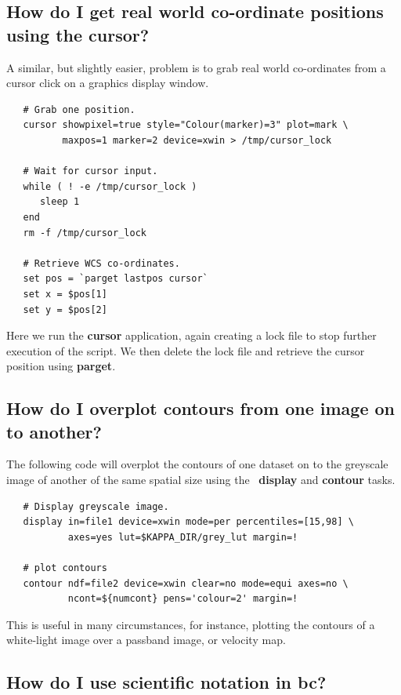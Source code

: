 \documentclass[twoside,11pt]{article}
\newcommand{\xref}[3]{#1}
\begin{document}
\begin{\htmlonly}
{\subsection{How do I get real world co-ordinate positions using the cursor?}

A similar, but slightly easier, problem is to grab real world
co-ordinates from a cursor click on a graphics display window.

\small\begin{verbatim}
   # Grab one position.
   cursor showpixel=true style="Colour(marker)=3" plot=mark \
          maxpos=1 marker=2 device=xwin > /tmp/cursor_lock

   # Wait for cursor input.	  
   while ( ! -e /tmp/cursor_lock )
      sleep 1
   end
   rm -f /tmp/cursor_lock
   
   # Retrieve WCS co-ordinates.
   set pos = `parget lastpos cursor`
   set x = $pos[1]
   set y = $pos[2]
\end{verbatim}\normalsize

Here we run the \xref{{\bf cursor}}{sun95}{CURSOR} application, again
creating a lock file to stop further execution of the script.  We then
delete the lock file and retrieve the cursor position using
\xref{{\bf parget}}{sun95}{PARGET}.

\subsection{How do I overplot contours from one image on to another?}

The following code will overplot the contours of one dataset on to the
greyscale image of another of the same spatial size using the \KAPPA\ 
\xref{{\bf display}}{sun95}{DISPLAY} and \xref{{\bf contour}}{sun95}{CONTOUR}
tasks.

\small\begin{verbatim}
   # Display greyscale image.
   display in=file1 device=xwin mode=per percentiles=[15,98] \
           axes=yes lut=$KAPPA_DIR/grey_lut margin=! 
	   
   # plot contours
   contour ndf=file2 device=xwin clear=no mode=equi axes=no \
           ncont=${numcont} pens='colour=2' margin=! 
\end{verbatim}\normalsize

This is useful in many circumstances, for instance, plotting the
contours of a white-light image over a passband image, or velocity
map.

\subsection{How do I use scientific notation in {\bf bc}?}

}
\end{\htmlonly}
\end{document}
